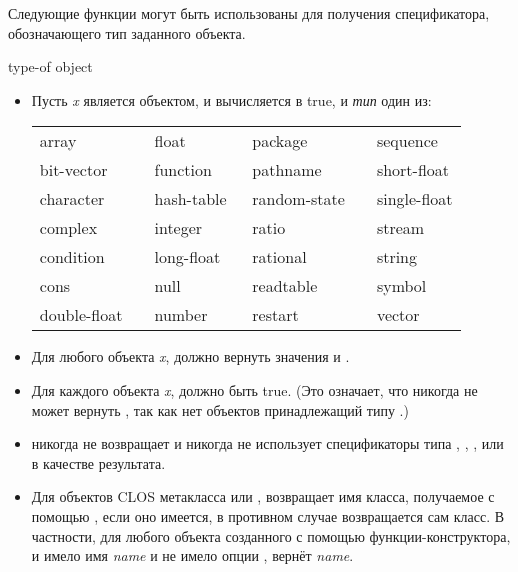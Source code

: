 Следующие функции могут быть использованы для получения спецификатора,
обозначающего тип заданного объекта.

\begin{defun}[Function]
type-of object


\begin{new}
\begin{itemize}
\item
Пусть \emph{x} является объектом, и 
вычисляется в true, и \emph{тип} один из:

\begin{flushleft}
\cf
\begin{tabular}{@{}llll@{}}
array          & float        & package        & sequence \\
bit-vector     & function     & pathname       & short-float \\
character      & hash-table   & random-state~~ & single-float \\
complex        & integer      & ratio          & stream \\
condition      & long-float~~ & rational       & string \\
cons           & null         & readtable      & symbol \\
double-float~~ & number       & restart        & vector
\end{tabular}
\end{flushleft}

\item
Для любого объекта \emph{x}, 
должно вернуть значения  и .

\item
Для каждого объекта \emph{x}, 
должно быть true. (Это означает, что  никогда не может вернуть
, так как нет объектов принадлежащий типу .)

\item
{} никогда не возвращает  и никогда не использует
спецификаторы типа , , ,  или  в
качестве результата.

\item
Для объектов CLOS метакласса  или ,
 возвращает имя класса, получаемое с помощью , если оно
имеется, в противном случае возвращается сам класс.
В частности, для любого объекта созданного с помощью 
функции-конструктора, и  имело имя \emph{name} и не имело опции
,  вернёт \emph{name}.
\end{itemize}


\end{new}
\end{defun}
